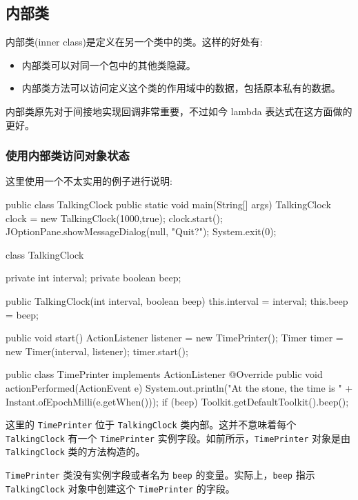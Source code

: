 \subsection{内部类}

内部类(inner class)是定义在另一个类中的类。这样的好处有:
\begin{itemize}
    \item 内部类可以对同一个包中的其他类隐藏。
    \item 内部类方法可以访问定义这个类的作用域中的数据，包括原本私有的数据。
\end{itemize}

内部类原先对于间接地实现回调非常重要，不过如今 lambda 表达式在这方面做的更好。

\subsubsection{使用内部类访问对象状态}

这里使用一个不太实用的例子进行说明:

\begin{Java}
public class TalkingClock {
    public static void main(String[] args) {
        TalkingClock clock = new TalkingClock(1000,true);
        clock.start();
        JOptionPane.showMessageDialog(null, "Quit?");
        System.exit(0);
    }
}

class TalkingClock {
    private int interval;
    private boolean beep;

    public TalkingClock(int interval, boolean beep) {
        this.interval = interval;
        this.beep = beep;
    }

    public void start() {
        ActionListener listener = new TimePrinter();
        Timer timer = new Timer(interval, listener);
        timer.start();
    }

    public class TimePrinter implements ActionListener{
        @Override
        public void actionPerformed(ActionEvent e) {
            System.out.println("At the stone, the time is " + Instant.ofEpochMilli(e.getWhen()));
            if (beep) Toolkit.getDefaultToolkit().beep();
        }
    }
}
\end{Java}

这里的 \texttt{TimePrinter} 位于 \texttt{TalkingClock} 类内部。这并不意味着每个 \texttt{TalkingClock} 有一个 \texttt{TimePrinter} 实例字段。如前所示，\texttt{TimePrinter} 对象是由 \texttt{TalkingClock} 类的方法构造的。

\texttt{TimePrinter} 类没有实例字段或者名为 \texttt{beep} 的变量。实际上，\texttt{beep} 指示 \texttt{TalkingClock} 对象中创建这个 \texttt{TimePrinter} 的字段。

